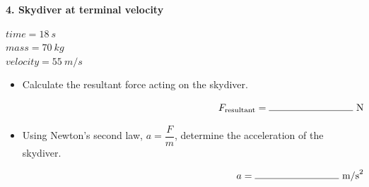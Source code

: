 \documentclass[12pt]{article}
\begin{document}
\noindent
\begin{minipage}[t]{0.48\textwidth}

\textbf{4. Skydiver at terminal velocity}

\vspace{0.5cm}
$time = \SI{18}{s}$ \\
$mass = \SI{70}{kg}$ \\
$velocity = \SI{55}{m/s}$ \\

\vspace{0.5cm}

\begin{center}
\end{center}

\end{minipage}
\hfill
\begin{minipage}[t]{0.48\textwidth}

\begin{itemize}[label={}, leftmargin=*]
    \item Calculate the resultant force acting on the skydiver.

    \vspace{2.0cm}
    \[
    \makebox[\linewidth][r]{$F_{\text{resultant}} = \rule{3cm}{0.4pt}\ \text{N}$}
    \]

    \item Using Newton’s second law, $a = \dfrac{F}{m}$, determine the acceleration of the skydiver.

    \vspace{2.0cm}
    \[
    \makebox[\linewidth][r]{$a = \rule{3cm}{0.4pt}\ \text{m/s}^{2}$}
    \]
\end{itemize}

\end{minipage}
\end{document}
